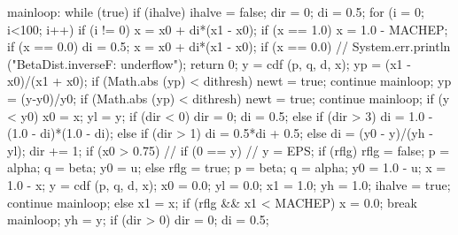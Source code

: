 \begin{code}
\begin{hide}
{mainloop:
      while (true) {
         if (ihalve) {
            ihalve = false;
            dir = 0;
            di = 0.5;
            for (i = 0; i<100; i++) {
               if (i != 0) {
                  x = x0  +  di*(x1 - x0);
                  if (x == 1.0)
                     x = 1.0 - MACHEP;
                  if (x == 0.0) {
                     di = 0.5;
                     x = x0  +  di*(x1 - x0);
                     if (x == 0.0) {
                        // System.err.println ("BetaDist.inverseF: underflow");
                        return 0;
                     }
                  }
                  y = cdf (p, q, d, x);
                  yp = (x1 - x0)/(x1 + x0);
                  if (Math.abs (yp) < dithresh) {
                     newt = true;
                     continue mainloop;
                  }
                  yp = (y-y0)/y0;
                  if (Math.abs (yp) < dithresh) {
                     newt = true;
                     continue mainloop;
                  }
               }
               if (y < y0) {
                  x0 = x;
                  yl = y;
                  if (dir < 0) {
                     dir = 0;
                     di = 0.5;
                  }
                  else if (dir > 3)
                     di = 1.0 - (1.0 - di)*(1.0 - di);
                  else if (dir > 1)
                     di = 0.5*di + 0.5;
                  else
                     di = (y0 - y)/(yh - yl);
                  dir += 1;
                  if (x0 > 0.75) {//            if (0 == y)
//               y = EPS;
                     if (rflg) {
                        rflg = false;
                        p = alpha;
                        q = beta;
                        y0 = u;
                     }
                     else {
                        rflg = true;
                        p = beta;
                        q = alpha;
                        y0 = 1.0 - u;
                     }
                     x = 1.0 - x;
                     y = cdf (p, q, d, x);
                     x0 = 0.0;
                     yl = 0.0;
                     x1 = 1.0;
                     yh = 1.0;
                     ihalve = true;
                     continue mainloop;
                  }
               }
               else {
                  x1 = x;
                  if (rflg && x1 < MACHEP) {
                     x = 0.0;
                     break mainloop;
                  }
                  yh = y;
                  if (dir > 0) {
                     dir = 0;
                     di = 0.5;
                  }
}}}}}
\end{hide}
\end{code}
